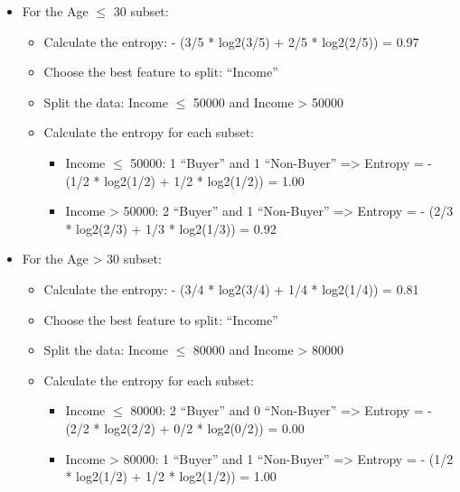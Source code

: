 \documentclass[12pt]{book}
\providecommand{\tightlist}{%
  \setlength{\itemsep}{0pt}\setlength{\parskip}{0pt}}
\begin{document}
\begin{itemize}
\tightlist
\item
  For the Age \(\le\) 30 subset:

  \begin{itemize}
  \tightlist
  \item
    Calculate the entropy: - (3/5 * log2(3/5) + 2/5 * log2(2/5)) = 0.97
  \item
    Choose the best feature to split: ``Income''
  \item
    Split the data: Income \(\le\) 50000 and Income \textgreater{} 50000
  \item
    Calculate the entropy for each subset:

    \begin{itemize}
    \tightlist
    \item
      Income \(\le\) 50000: 1 ``Buyer'' and 1 ``Non-Buyer'' =\textgreater{}
      Entropy = - (1/2 * log2(1/2) + 1/2 * log2(1/2)) = 1.00
    \item
      Income \textgreater{} 50000: 2 ``Buyer'' and 1 ``Non-Buyer''
      =\textgreater{} Entropy = - (2/3 * log2(2/3) + 1/3 * log2(1/3)) =
      0.92
    \end{itemize}
  \end{itemize}
\item
  For the Age \textgreater{} 30 subset:

  \begin{itemize}
  \tightlist
  \item
    Calculate the entropy: - (3/4 * log2(3/4) + 1/4 * log2(1/4)) = 0.81
  \item
    Choose the best feature to split: ``Income''
  \item
    Split the data: Income \(\le\) 80000 and Income \textgreater{} 80000
  \item
    Calculate the entropy for each subset:

    \begin{itemize}
    \tightlist
    \item
      Income \(\le\) 80000: 2 ``Buyer'' and 0 ``Non-Buyer'' =\textgreater{}
      Entropy = - (2/2 * log2(2/2) + 0/2 * log2(0/2)) = 0.00
    \item
      Income \textgreater{} 80000: 1 ``Buyer'' and 1 ``Non-Buyer''
      =\textgreater{} Entropy = - (1/2 * log2(1/2) + 1/2 * log2(1/2)) =
      1.00
    \end{itemize}
  \end{itemize}
\end{itemize}
\end{document}
